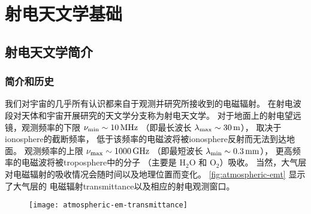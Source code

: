 

\chapter{射电天文学基础}
\label{chap:radio-astronomy}

\section{射电天文学简介}
\label{sec:radio-astro-intro}

\subsection{简介和历史}

我们对宇宙的几乎所有认识都来自于观测并研究所接收到的电磁辐射。
在射电波段对天体和宇宙开展研究的天文学分支称为射电天文学。
对于地面上的射电望远镜，观测频率的下限 $\nu_{\R{min}} \sim \SI{10}{\MHz}$
（即最长波长 $\lambda_{\mathrm{max}} \sim \SI{30}{\meter}$），
取决于\ac{ionosphere}的截断频率，
低于该频率的电磁波将被\ac{ionosphere}反射而无法到达地面。
观测频率的上限 $\nu_{\R{max}} \sim \SI{1000}{\GHz}$
（即最短波长 $\lambda_{\R{min}} \sim \SI{0.3}{\mm}$），
更高频率的电磁波将被\ac{troposphere}中的分子
（主要是 $\mathrm{H_2 O}$ 和 $\mathrm{O_2}$）吸收。
当然，大气层对电磁辐射的吸收情况会随时间以及地理位置而变化。
\autoref{fig:atmospheric-emt} 显示了大气层的
电磁辐射\ac{transmittance}以及相应的射电观测窗口。

\begin{figure}[htp]
  \centering
  \texttt{[image: atmospheric-em-transmittance]}
  \label{fig:atmospheric-emt}
\end{figure}


